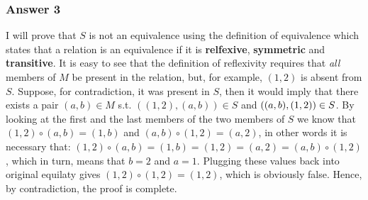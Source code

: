 \documentclass[11pt]{article}
\begin{document}
\subsubsection{Answer 3}
\label{sec-1-1-2}
I will prove that $S$ is not an equivalence using the definition of
equivalence which states that a relation is an equivalence if it is
\textbf{relfexive}, \textbf{symmetric} and \textbf{transitive}.  It is easy to see that the
definition of reflexivity requires that \emph{all} members of $M$ be present in
the relation, but, for example, $(1, 2)$ is absent from $S$.  Suppose, for
contradiction, it was present in $S$, then it would imply that there exists
a pair $(a, b) \in M$ s.t. $((1, 2), (a, b)) \in S$ and $((a, b), (1, 2))
    \in\nobreak S$.  By looking at the first and the last members of the two members of
$S$ we know that $(1, 2) \circ (a, b) = (1, b)$ and $(a, b) \circ (1, 2) = (a,
    2)$, in other words it is necessary that: $(1, 2) \circ (a, b) = (1, b) =
    (1, 2) = (a, 2) = (a, b) \circ (1, 2)$, which in turn, means that $b=2$ and
$a=1$.  Plugging these values back into original equilaty gives $(1, 2) \circ
    (1, 2) = (1, 2)$, which is obviously false.  Hence, by contradiction, the
proof is complete.
\end{document}
